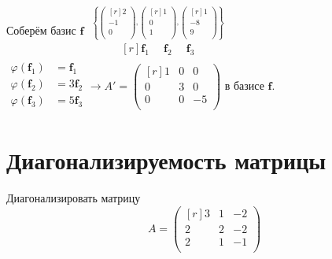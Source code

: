 Соберём базис $\textbf{f}$ %
$  %
\begin{matrix}
\overset{\left\{
\begin{pmatrix*}[r]
2\\ -1\\ 0\\ 
\end{pmatrix*},
\begin{pmatrix*}[r]
1\\ 0\\ 1\\ 
\end{pmatrix*},
\begin{pmatrix*}[r]
1\\ -8\\ 9\\ 
\end{pmatrix*}
\right\}}{
\begin{matrix*}[r]
\textbf{f$_1$}\phantom{3}&\textbf{f$_2$}&\phantom{2}\textbf{f$_3$}
\end{matrix*}}
\end{matrix}
$\\
$
\left.
\begin{aligned} %
\varphi (\textbf{f$_1$})&=\textbf{f$_1$}\\ %
\varphi (\textbf{f$_2$})&=3\textbf{f$_2$} \\
\varphi (\textbf{f$_3$})&=5\textbf{f$_3$}\\
\end{aligned}
\right.
\to A'=
\begin{pmatrix*}[r]
 1 & 0 & 0\\
 0 & 3 & 0\\
 0 & 0 & -5\\
\end{pmatrix*}
$
в базисе $\textbf{f}$.\\ %

\section{Диагонализируемость матрицы}
\begin{prim}
Диагонализировать матрицу\\
$$
 A=
\begin{pmatrix*}[r]
 3 & 1 & -2\\
 2 & 2 & -2\\
 2 & 1 & -1\\
\end{pmatrix*}
$$
\end{prim}

